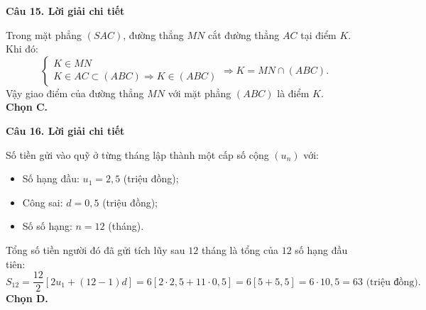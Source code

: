 \documentclass[12pt, a4paper]{article}
\begin{document}
\noindent\textbf{Câu 15. Lời giải chi tiết}\par
\begin{tcolorbox}[enhanced,breakable,colback=solutionbg,colframe=secondary!50!black,frame hidden,borderline west={3pt}{0pt}{secondary!50!black}]
Trong mặt phẳng $(SAC)$, đường thẳng $MN$ cắt đường thẳng $AC$ tại điểm $K$. Khi đó:
$$\begin{cases} K \in MN \\ K \in AC \subset (ABC) \Rightarrow K \in (ABC) \end{cases} \Rightarrow K = MN \cap (ABC).$$
Vậy giao điểm của đường thẳng $MN$ với mặt phẳng $(ABC)$ là điểm $K$.\\
\textbf{Chọn C.}
\end{tcolorbox}

\noindent\textbf{Câu 16. Lời giải chi tiết}\par
\begin{tcolorbox}[enhanced,breakable,colback=solutionbg,colframe=secondary!50!black,frame hidden,borderline west={3pt}{0pt}{secondary!50!black}]
Số tiền gửi vào quỹ ở từng tháng lập thành một cấp số cộng $(u_n)$ với:
\begin{itemize}[leftmargin=1.5em]
\item Số hạng đầu: $u_1 = 2{,}5$ (triệu đồng);
\item Công sai: $d = 0{,}5$ (triệu đồng);
\item Số số hạng: $n = 12$ (tháng).
\end{itemize}
Tổng số tiền người đó đã gửi tích lũy sau $12$ tháng là tổng của $12$ số hạng đầu tiên:
$$S_{12} = \dfrac{12}{2}\left[2u_1 + (12 - 1)d\right] = 6\left[2 \cdot 2{,}5 + 11 \cdot 0{,}5\right] = 6\left[5 + 5{,}5\right] = 6 \cdot 10{,}5 = 63\text{ (triệu đồng)}.$$
\textbf{Chọn D.}
\end{tcolorbox}
\end{document}

